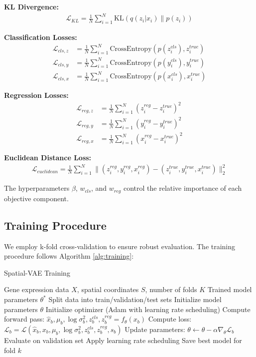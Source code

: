 \documentclass[11pt]{article}
\begin{document}
\textbf{KL Divergence:}
\begin{align}
\mathcal{L}_{KL} = \frac{1}{N} \sum_{i=1}^N \text{KL}(q(z_i|x_i) \| p(z_i))
\end{align}

\textbf{Classification Losses:}
\begin{align}
\mathcal{L}_{cls,z} &= \frac{1}{N} \sum_{i=1}^N \text{CrossEntropy}(p(z^{cls}_i), z^{true}_i) \\
\mathcal{L}_{cls,y} &= \frac{1}{N} \sum_{i=1}^N \text{CrossEntropy}(p(y^{cls}_i), y^{true}_i) \\
\mathcal{L}_{cls,x} &= \frac{1}{N} \sum_{i=1}^N \text{CrossEntropy}(p(x^{cls}_i), x^{true}_i)
\end{align}

\textbf{Regression Losses:}
\begin{align}
\mathcal{L}_{reg,z} &= \frac{1}{N} \sum_{i=1}^N (z^{reg}_i - z^{true}_i)^2 \\
\mathcal{L}_{reg,y} &= \frac{1}{N} \sum_{i=1}^N (y^{reg}_i - y^{true}_i)^2 \\
\mathcal{L}_{reg,x} &= \frac{1}{N} \sum_{i=1}^N (x^{reg}_i - x^{true}_i)^2
\end{align}

\textbf{Euclidean Distance Loss:}
\begin{align}
\mathcal{L}_{euclidean} = \frac{1}{N} \sum_{i=1}^N \|(z^{reg}_i, y^{reg}_i, x^{reg}_i) - (z^{true}_i, y^{true}_i, x^{true}_i)\|_2^2
\end{align}

The hyperparameters $\beta$, $w_{cls}$, and $w_{reg}$ control the relative importance of each objective component.

\subsection{Training Procedure}

We employ k-fold cross-validation to ensure robust evaluation. The training procedure follows Algorithm \ref{alg:training}:

\begin{algorithm}
\caption{Spatial-VAE Training}
\label{alg:training}
\begin{algorithmic}[1]
\REQUIRE Gene expression data $X$, spatial coordinates $S$, number of folds $K$
\ENSURE Trained model parameters $\theta^*$
    \STATE Split data into train/validation/test sets
    \STATE Initialize model parameters $\theta$
    \STATE Initialize optimizer (Adam with learning rate scheduling)
            \STATE Compute forward pass: $\hat{x}_b, \mu_b, \log\sigma^2_b, z^{cls}_b, z^{reg}_b = f_\theta(x_b)$
            \STATE Compute loss: $\mathcal{L}_b = \mathcal{L}(\hat{x}_b, x_b, \mu_b, \log\sigma^2_b, z^{cls}_b, z^{reg}_b, s_b)$
            \STATE Update parameters: $\theta \leftarrow \theta - \alpha \nabla_\theta \mathcal{L}_b$
        \ENDFOR
        \STATE Evaluate on validation set
        \STATE Apply learning rate scheduling
    \ENDFOR
    \STATE Save best model for fold $k$
\ENDFOR
\end{algorithmic}
\end{algorithm}
\end{document}
